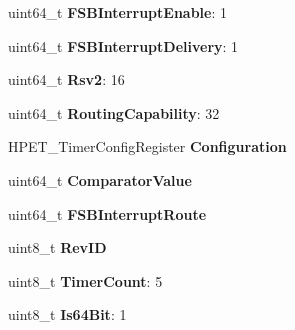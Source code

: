 \begin{DoxyCompactItemize}
\item 
uint64\+\_\+t {\bfseries F\+S\+B\+Interrupt\+Enable}\+: 1\hypertarget{struct____attribute_____ab4db1ff2fd8291702aa674274eace726}{}\label{struct____attribute_____ab4db1ff2fd8291702aa674274eace726}

\item 
uint64\+\_\+t {\bfseries F\+S\+B\+Interrupt\+Delivery}\+: 1\hypertarget{struct____attribute_____a6596a22a80224f5d0ae26e58b83d4123}{}\label{struct____attribute_____a6596a22a80224f5d0ae26e58b83d4123}

\item 
uint64\+\_\+t {\bfseries Rsv2}\+: 16\hypertarget{struct____attribute_____a701a00356c6b699be329fb674bc54e19}{}\label{struct____attribute_____a701a00356c6b699be329fb674bc54e19}

\item 
uint64\+\_\+t {\bfseries Routing\+Capability}\+: 32\hypertarget{struct____attribute_____a52d1b84716a9742ee7e2f3b5098a4dde}{}\label{struct____attribute_____a52d1b84716a9742ee7e2f3b5098a4dde}

\item 
H\+P\+E\+T\+\_\+\+Timer\+Config\+Register {\bfseries Configuration}\hypertarget{struct____attribute_____a1b8ecd283b1ccb24770cb34db29dba66}{}\label{struct____attribute_____a1b8ecd283b1ccb24770cb34db29dba66}

\item 
uint64\+\_\+t {\bfseries Comparator\+Value}\hypertarget{struct____attribute_____a9911997d3010579b84f0e7595003419a}{}\label{struct____attribute_____a9911997d3010579b84f0e7595003419a}

\item 
uint64\+\_\+t {\bfseries F\+S\+B\+Interrupt\+Route}\hypertarget{struct____attribute_____ab6b0e4e77dc5e45d79efd21cb43bf234}{}\label{struct____attribute_____ab6b0e4e77dc5e45d79efd21cb43bf234}

\item 
uint8\+\_\+t {\bfseries Rev\+ID}\hypertarget{struct____attribute_____a71f20d5001945e7b6948818f2f2a987b}{}\label{struct____attribute_____a71f20d5001945e7b6948818f2f2a987b}

\item 
uint8\+\_\+t {\bfseries Timer\+Count}\+: 5\hypertarget{struct____attribute_____a85e6377b8c93c61096633f0e9bbf38ce}{}\label{struct____attribute_____a85e6377b8c93c61096633f0e9bbf38ce}

\item 
uint8\+\_\+t {\bfseries Is64\+Bit}\+: 1\hypertarget{struct____attribute_____a356b4f3faa8a7e71e97742dbb0820970}{}\label{struct____attribute_____a356b4f3faa8a7e71e97742dbb0820970}


\end{DoxyCompactItemize}
